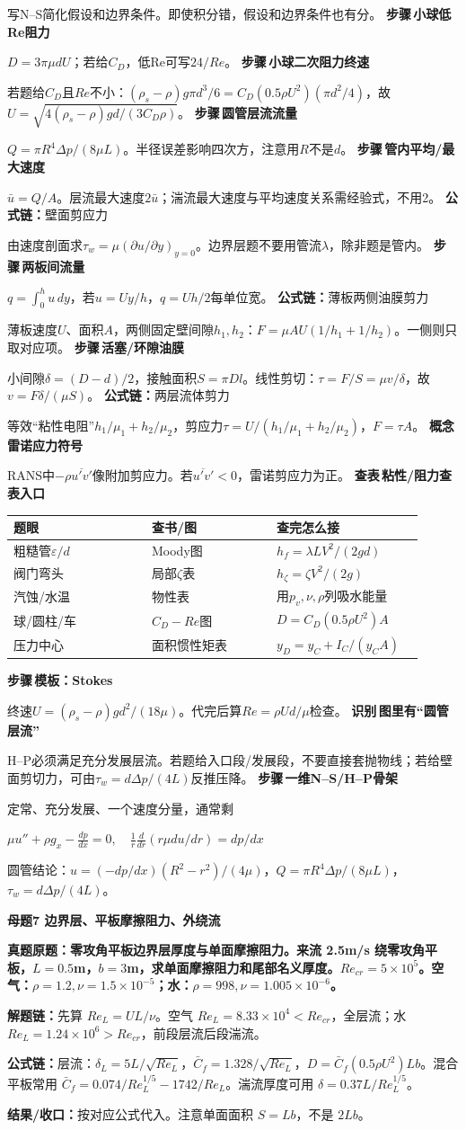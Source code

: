 \documentclass[a4paper]{article}
\newcommand{\mt}[1]{\vspace{0.45pt}\colorbox{M}{\parbox{\dimexpr\linewidth-2\fboxsep}{\color{white}\bfseries #1}}\par}
\newcommand{\qt}[1]{\vspace{0.25pt}\colorbox{Q}{\parbox{\dimexpr\linewidth-2\fboxsep}{\color{white}\bfseries #1}}\par}
\newcommand{\ans}[1]{\colorbox{G}{\parbox{\dimexpr\linewidth-2\fboxsep}{#1}}\par}
\newcommand{\chain}[1]{{\color{A}\bfseries 解题链：}#1\par}
\newcommand{\res}[1]{{\color{E}\bfseries 结果/收口：}#1\par}
\newcommand{\form}[1]{{\color{M}\bfseries 公式链：}#1\par}
\newcommand{\fmlb}[1]{\ans{\begin{adjustbox}{max width=.96\linewidth}$\displaystyle #1$\end{adjustbox}}}
\newcommand{\labtag}[3]{{\bfseries\color{#1}\colorbox{#1}{\color{white}\fontsize{2.35}{2.48}\selectfont #2}\,#3}\par}
\newcommand{\iden}[1]{\labtag{C}{识别}{#1}}
\newcommand{\step}[1]{\labtag{S}{步骤}{#1}}
\newcommand{\lookup}[1]{\labtag{C}{查表}{#1}}
\newcommand{\concept}[1]{\labtag{V}{概念}{#1}}
\newcommand{\idq}[1]{\iden{#1}}
\newcommand{\stepq}[1]{\step{#1}}
\newcommand{\formq}[1]{\form{#1}}
\newcommand{\lookq}[1]{\lookup{#1}}
\newcommand{\conceptq}[1]{\concept{#1}}
\newenvironment{vfourWrap}{\par\begingroup\fontsize{2.68}{2.84}\selectfont\setlength{\fboxsep}{0.45pt}}{\par\endgroup}
\begin{document}
\begin{multicols}{3}
\begin{vfourWrap}
写N--S简化假设和边界条件。即使积分错，假设和边界条件也有分。
\stepq{小球低Re阻力}
$D=3\pi\mu dU$；若给$C_D$，低Re可写$24/Re$。
\stepq{小球二次阻力终速}
若题给$C_D$且$Re$不小：$(\rho_s-\rho)g\pi d^3/6=C_D(0.5\rho U^2)(\pi d^2/4)$，故$U=\sqrt{4(\rho_s-\rho)gd/(3C_D\rho)}$。
\stepq{圆管层流流量}
$Q=\pi R^4\Delta p/(8\mu L)$。半径误差影响四次方，注意用$R$不是$d$。
\stepq{管内平均/最大速度}
$\bar u=Q/A$。层流最大速度$2\bar u$；湍流最大速度与平均速度关系需经验式，不用2。
\formq{壁面剪应力}
由速度剖面求$\tau_w=\mu(\partial u/\partial y)_{y=0}$。边界层题不要用管流$\lambda$，除非题是管内。
\stepq{两板间流量}
$q=\int_0^hu\,dy$，若$u=Uy/h$，$q=Uh/2$每单位宽。
\formq{薄板两侧油膜剪力}
薄板速度$U$、面积$A$，两侧固定壁间隙$h_1,h_2$：$F=\mu AU(1/h_1+1/h_2)$。一侧则只取对应项。
\stepq{活塞/环隙油膜}
小间隙$\delta=(D-d)/2$，接触面积$S=\pi Dl$。线性剪切：$\tau=F/S=\mu v/\delta$，故$v=F\delta/(\mu S)$。
\formq{两层流体剪力}
等效“粘性电阻”$h_1/\mu_1+h_2/\mu_2$，剪应力$\tau=U/(h_1/\mu_1+h_2/\mu_2)$，$F=\tau A$。
\conceptq{雷诺应力符号}
RANS中$-\rho\overline{u'v'}$像附加剪应力。若$\overline{u'v'}<0$，雷诺剪应力为正。
\lookq{粘性/阻力查表入口}
\begin{tabular}{|p{0.31\linewidth}|p{0.28\linewidth}|p{0.33\linewidth}|}\hline
题眼 & 查书/图 & 查完怎么接\\\hline
粗糙管$\varepsilon/d$ & Moody图 & $h_f=\lambda L V^2/(2gd)$\\\hline
阀门弯头 & 局部$\zeta$表 & $h_\zeta=\zeta V^2/(2g)$\\\hline
汽蚀/水温 & 物性表 & 用$p_v,\nu,\rho$列吸水能量\\\hline
球/圆柱/车 & $C_D-Re$图 & $D=C_D(0.5\rho U^2)A$\\\hline
压力中心 & 面积惯性矩表 & $y_D=y_C+I_C/(y_CA)$\\\hline
\end{tabular}
\stepq{模板：Stokes}
终速$U=(\rho_s-\rho)gd^2/(18\mu)$。代完后算$Re=\rho Ud/\mu$检查。
\idq{图里有“圆管层流”}
H--P必须满足充分发展层流。若题给入口段/发展段，不要直接套抛物线；若给壁面剪切力，可由$\tau_w=d\Delta p/(4L)$反推压降。
\stepq{一维N--S/H--P骨架}
定常、充分发展、一个速度分量，通常剩
\fmlb{\mu u''+\rho g_x-\frac{dp}{dx}=0,\quad \frac1r\frac d{dr}(r\mu du/dr)=dp/dx}
圆管结论：$u=(-dp/dx)(R^2-r^2)/(4\mu)$，$Q=\pi R^4\Delta p/(8\mu L)$，$\tau_w=d\Delta p/(4L)$。
\end{vfourWrap}
\mt{母题7 边界层、平板摩擦阻力、外绕流}
\qt{真题原题：零攻角平板边界层厚度与单面摩擦阻力。来流 2.5m/s 绕零攻角平板，$L=0.5$m，$b=3$m，求单面摩擦阻力和尾部名义厚度。$Re_{cr}=5\times10^5$。空气：$\rho=1.2,\nu=1.5\times10^{-5}$；水：$\rho=998,\nu=1.005\times10^{-6}$。}
\chain{先算 $Re_L=UL/\nu$。空气 $Re_L=8.33\times10^4<Re_{cr}$，全层流；水 $Re_L=1.24\times10^6>Re_{cr}$，前段层流后段湍流。}
\form{层流：$\delta_L=5L/\sqrt{Re_L}$，$\bar C_f=1.328/\sqrt{Re_L}$，$D=\bar C_f(0.5\rho U^2)Lb$。混合平板常用 $\bar C_f=0.074/Re_L^{1/5}-1742/Re_L$。湍流厚度可用 $\delta=0.37L/Re_L^{1/5}$。}
\res{按对应公式代入。注意单面面积 $S=Lb$，不是 $2Lb$。}


\end{multicols}
\end{document}
